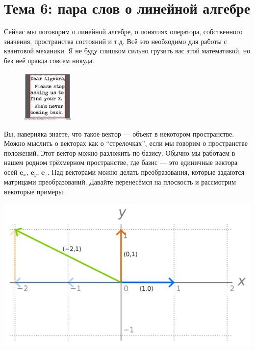 \documentclass[12pt]{article}
\begin{document}
\section*{Тема 6: пара слов о линейной алгебре}
Сейчас мы поговорим о линейной алгебре, о понятиях оператора, собственного значения, пространства состояний и т.д. Всё это необходимо для работы с квантовой механики. Я не буду слишком сильно грузить вас этой математикой, но без неё правда совсем никуда.

\begin{figure}
  \begin{center}
    \includegraphics[width=0.23\textwidth]{algebrajoke.png}
  \end{center}
\end{figure}

Вы, наверняка знаете, что такое вектор --- объект в некотором пространстве. Можно мыслить о векторах как о ``стрелочках'', если мы говорим о пространстве положений. Этот вектор можно разложить по базису. Обычно мы работаем в нашем родном трёхмерном пространстве, где базис --- это единичные вектора осей $\mathbf{e}_x$, $\mathbf{e}_y$, $\mathbf{e}_z$. Над векторами можно делать преобразования, которые задаются матрицами преобразований. Давайте перенесёмся на плоскость и рассмотрим некоторые примеры.

\begin{center}
\includegraphics[scale=0.15]{basis.png}
\end{center}
\end{document}
